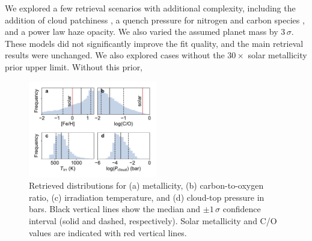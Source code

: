 \documentclass[twocolumn, trackchanges]{aastex61}
\begin{document}
We explored a few retrieval scenarios with additional complexity, including the addition of cloud patchiness \citep{line16}, a quench pressure for nitrogen and carbon species \citep[e.g.][]{morley17}, and a power law haze opacity.  We also varied the assumed planet mass by $3\,\sigma$. These models did not significantly improve the fit quality, and the main retrieval results were unchanged.  We also explored cases without the $30\times$ solar metallicity prior upper limit. Without this prior, 


\begin{figure}
\includegraphics[width = 0.5\textwidth]{fig4_retrieval.pdf}
\caption{Retrieved distributions for (a) metallicity, (b) carbon-to-oxygen ratio, (c) irradiation temperature, and (d) cloud-top pressure in bars. Black vertical lines show the median and $\pm1\,\sigma$ confidence interval (solid and dashed, respectively). Solar metallicity and C/O values are indicated with red vertical lines.}  \label{fig:retrieval}
\end{figure}
\end{document}
